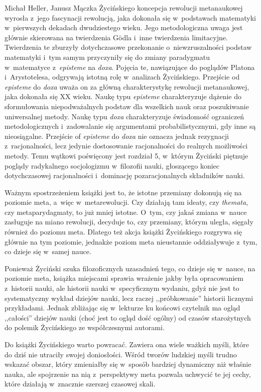 \begin{newrevplenv2auth}{Michał Heller, Janusz Mączka}
Życińskiego koncepcja rewolucji metanaukowej wyrosła z~jego fascynacji rewolucją, jaka dokonała się w~podstawach matematyki w~pierwszych dekadach dwudziestego wieku. Jego metodologiczna uwaga jest głównie skierowana na twierdzenia Gödla i~inne twierdzenia limitacyjne. Twierdzenia te zburzyły dotychczasowe przekonanie o~niewzruszalności podstaw matematyki i~tym samym przyczyniły się do zmiany paradygmatu w~matematyce z~\textit{episteme} na \textit{doxa}. Pojęcia te, nawiązujące do poglądów Platona i~Arystotelesa, odgrywają istotną rolę w~analizach Życińskiego. Przejście od \textit{episteme} do \textit{doxa} uważa on za główną charakterystykę rewolucji metanaukowej, jaka dokonała się XX wieku. Naukę typu \textit{episteme} charakteryzuje dążenie do sformułowania niepodważalnych podstaw dla wszelkich nauk oraz poszukiwanie uniwersalnej metody. Naukę typu \textit{doxa} charakteryzuje świadomość ograniczeń metodologicznych i~zadowalanie się argumentami probabilistycznymi, gdy inne są nieosiągalne. Przejście of \textit{episteme} do \textit{doxa} nie oznacza jednak rezygnacji z~racjonalności, lecz jedynie dostosowanie racjonalności do realnych możliwości metody. Temu wątkowi poświęcony jest rozdział 5, w~którym Życiński piętnuje poglądy radykalnego socjologizmu w~filozofii nauki, głoszącego koniec dotychczasowej racjonalności i~dominację pozaracjonalnych składników nauki.

Ważnym spostrzeżeniem książki jest to, że istotne przemiany dokonują się na poziomie meta, a~więc w~metarewolucji. Czy działają tam ideaty, czy \textit{themata}, czy metaparydagmaty, to już mniej istotne. O~tym, czy jakaś zmiana w~nauce zasługuje na miano rewolucji, decyduje to, czy przemiany, którym uległa, sięgały również do poziomu meta. Dlatego też akcja książki Życińskiego rozgrywa się głównie na tym poziomie, jednakże poziom meta nieustannie oddziaływuje z~tym, co dzieje się w~samej nauce.

Ponieważ Życiński szuka filozoficznych uzasadnień tego, co dzieje się w~nauce, na poziomie meta, książka miejscami sprawia wrażenie jakby była opracowaniem z~historii nauki, ale historii nauki w~specyficznym wydaniu, gdyż nie jest to systematyczny wykład dziejów nauki, lecz raczej ,,próbkowanie'' historii licznymi przykładami. Jednak zbliżając się w~lekturze ku końcowi czytelnik ma ogląd ,,całości'' dziejów nauki (choć jest to ogląd dość ogólny) od czasów starożytnych do polemik Życińskiego ze współczesnymi autorami.

Do książki Życińskiego warto powracać. Zawiera ona wiele ważkich myśli, które do dziś nie utraciły swojej doniosłości. Wśród tworów ludzkiej myśli trudno wskazać obszar, który zmieniałby się w~sposób bardziej dynamiczny niż właśnie nauka, ale spojrzenie na nią z~perspektywy meta pozwala uchwycić te jej cechy, które działają w~znacznie szerszej czasowej skali.





\end{newrevplenv2auth}
